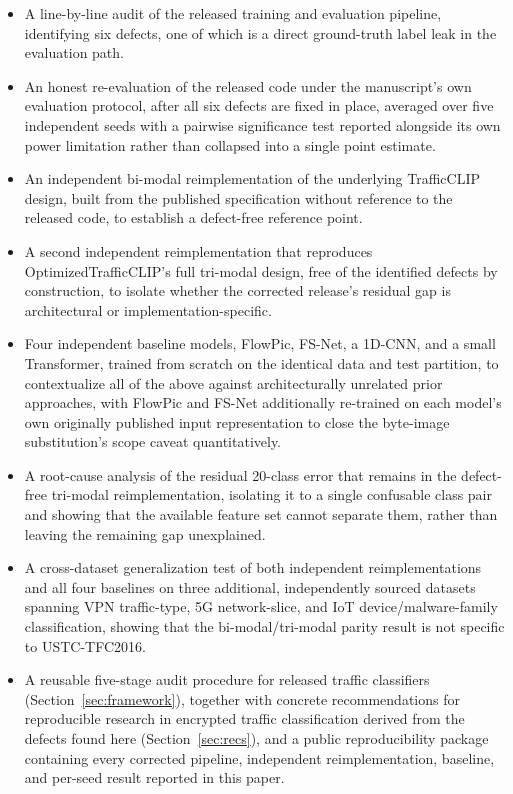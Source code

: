 \documentclass[journal]{IEEEtran}
\begin{document}
\begin{itemize}
\item A line-by-line audit of the released training and evaluation pipeline, identifying six defects, one of which is a direct ground-truth label leak in the evaluation path.
\item An honest re-evaluation of the released code under the manuscript's own evaluation protocol, after all six defects are fixed in place, averaged over five independent seeds with a pairwise significance test reported alongside its own power limitation rather than collapsed into a single point estimate.
\item An independent bi-modal reimplementation of the underlying TrafficCLIP design, built from the published specification without reference to the released code, to establish a defect-free reference point.
\item A second independent reimplementation that reproduces OptimizedTrafficCLIP's full tri-modal design, free of the identified defects by construction, to isolate whether the corrected release's residual gap is architectural or implementation-specific.
\item Four independent baseline models, FlowPic, FS-Net, a 1D-CNN, and a small Transformer, trained from scratch on the identical data and test partition, to contextualize all of the above against architecturally unrelated prior approaches, with FlowPic and FS-Net additionally re-trained on each model's own originally published input representation to close the byte-image substitution's scope caveat quantitatively.
\item A root-cause analysis of the residual 20-class error that remains in the defect-free tri-modal reimplementation, isolating it to a single confusable class pair and showing that the available feature set cannot separate them, rather than leaving the remaining gap unexplained.
\item A cross-dataset generalization test of both independent reimplementations and all four baselines on three additional, independently sourced datasets spanning VPN traffic-type, 5G network-slice, and IoT device/malware-family classification, showing that the bi-modal/tri-modal parity result is not specific to USTC-TFC2016.
\item A reusable five-stage audit procedure for released traffic classifiers (Section~\ref{sec:framework}), together with concrete recommendations for reproducible research in encrypted traffic classification derived from the defects found here (Section~\ref{sec:recs}), and a public reproducibility package containing every corrected pipeline, independent reimplementation, baseline, and per-seed result reported in this paper.
\end{itemize}
\end{document}
